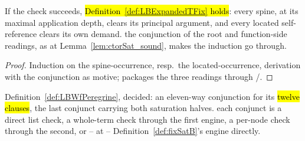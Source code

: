 \begin{lemma}
\label{lem:fixSat_sound}

\leanok
{}
 If the check succeeds, \hl{Definition~\ref{def:LBExpandedTFix} holds}: every
 spine, at its maximal application depth, clears its principal argument, and every
located self-reference clears its own demand.
 the conjunction of the root and function-side readings, as at
Lemma~\ref{lem:ctorSat_sound}, makes the induction go through.
\end{lemma}
\begin{proof}
\leanok
{}
 Induction on the spine-occurrence, resp.\ the located-occurrence, derivation with the
conjunction as motive;  packages the three readings through
/.
\end{proof}

\begin{definition}
\label{def:lbWfPeregrineB}
\leanok
{}
 Definition~\ref{def:LBWfPeregrine}, decided: an eleven-way conjunction for its
\hl{twelve clauses}, the last conjunct carrying both saturation halves.
 each conjunct is a direct list check, a whole-term check through the first engine, a
per-node check through the second, or -- at  -- Definition~\ref{def:fixSatB}'s
engine directly.
\end{definition}

